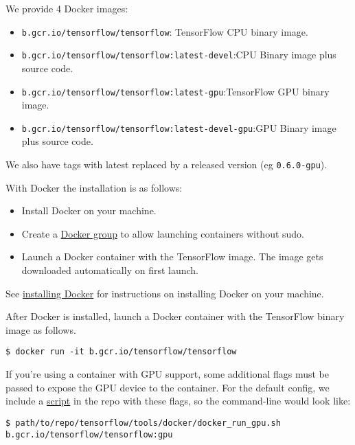 We provide 4 Docker images:

\begin{itemize}
\item \lstinline{b.gcr.io/tensorflow/tensorflow}: TensorFlow CPU binary image.
\item \lstinline{b.gcr.io/tensorflow/tensorflow:latest-devel}:CPU Binary image plus source code.
\item \lstinline{b.gcr.io/tensorflow/tensorflow:latest-gpu}:TensorFlow GPU binary image.
\item \lstinline{b.gcr.io/tensorflow/tensorflow:latest-devel-gpu}:GPU Binary image plus source code.
\end{itemize}

We also have tags with latest replaced by a released version (eg \lstinline{0.6.0-gpu}).

With Docker the installation is as follows:

\begin{itemize}
\item Install Docker on your machine.
\item Create a \href{http://docs.docker.com/engine/installation/ubuntulinux/#create-a-docker-group}{Docker group} to allow launching containers without sudo.
\item Launch a Docker container with the TensorFlow image. The image gets downloaded automatically on first launch.
\end{itemize}

See \href{http://docs.docker.com/engine/installation/}{installing Docker} for instructions on installing Docker on your machine.

After Docker is installed, launch a Docker container with the TensorFlow binary image as follows.

\begin{lstlisting}
$ docker run -it b.gcr.io/tensorflow/tensorflow
\end{lstlisting}

If you're using a container with GPU support, some additional flags must be passed to expose the GPU device to the container. For the default config, we include a \href{https://github.com/tensorflow/tensorflow/blob/master/tensorflow/tools/docker/docker_run_gpu.sh}{script} in the repo with these flags, so the command-line would look like:

\begin{lstlisting}
$ path/to/repo/tensorflow/tools/docker/docker_run_gpu.sh b.gcr.io/tensorflow/tensorflow:gpu
\end{lstlisting}

